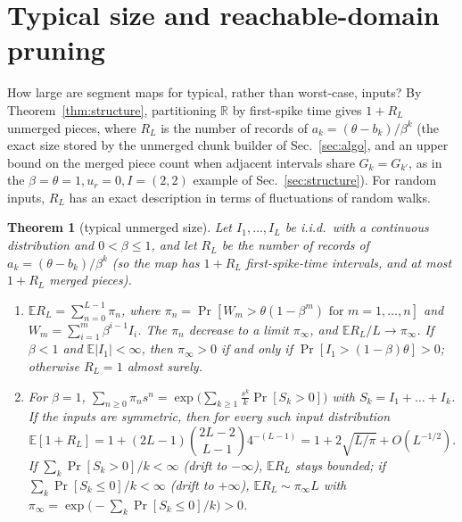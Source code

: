 \documentclass[10pt]{article}
\newtheorem{theorem}{Theorem}
\newcounter{algo}
\theoremstyle{remark}
\begin{document}
\begin{table}[t]
\centering\small

\caption{Number of pieces of $L$-step maps for different reset rules (exact arithmetic). Rows 1--6: largest number found by hill-climbing over inputs in $[-1,1.5]$ ($\beta\in\{0.5,0.9,0.99\}$), which gives lower bounds on the maximum. ``Construction'': the explicit inputs of Theorem~\ref{thm:classes}(c)(i), which are not confined to $[-1,1.5]$ when the reset has a drop. Last three rows: the bounds of Theorem~\ref{thm:classes}(a), (b) and (c).}
\label{tab:resets}
\end{table}

\section{Typical size and reachable-domain pruning}
\label{sec:domain}

How large are segment maps for typical, rather than worst-case, inputs? By Theorem~\ref{thm:structure}, partitioning $\mathbb R$ by first-spike time gives $1+R_L$ unmerged pieces, where $R_L$ is the number of records of $a_k=(\theta-b_k)/\beta^k$ (the exact size stored by the unmerged chunk builder of Sec.~\ref{sec:algo}, and an upper bound on the merged piece count when adjacent intervals share $G_k=G_{k'}$, as in the $\beta=\theta=1, u_r=0, I=(2,2)$ example of Sec.~\ref{sec:structure}). For random inputs, $R_L$ has an exact description in terms of fluctuations of random walks.

\begin{theorem}[typical unmerged size]
\label{thm:typical}
Let $I_1,\dots,I_L$ be i.i.d.\ with a continuous distribution and $0<\beta\le1$, and let $R_L$ be the number of records of $a_k=(\theta-b_k)/\beta^k$ (so the map has $1+R_L$ first-spike-time intervals, and at most $1+R_L$ merged pieces).
\begin{enumerate}[label=(\alph*),leftmargin=*]
\item $\mathbb E R_L=\sum_{n=0}^{L-1}\pi_n$, where $\pi_n=\Pr[W_m>\theta(1-\beta^m)\text{ for }m=1,\dots,n]$ and $W_m=\sum_{i=1}^m\beta^{i-1}I_i$. The $\pi_n$ decrease to a limit $\pi_\infty$, and $\mathbb E R_L/L\to\pi_\infty$. If $\beta<1$ and $\mathbb E|I_1|<\infty$, then $\pi_\infty>0$ if and only if $\Pr[I_1>(1-\beta)\theta]>0$; otherwise $R_L=1$ almost surely.
\item For $\beta=1$, $\sum_{n\ge0}\pi_ns^n=\exp\big(\sum_{k\ge1}\tfrac{s^k}{k}\Pr[S_k>0]\big)$ with $S_k=I_1+\dots+I_k$. If the inputs are symmetric, then for every such input distribution
\[\mathbb E[1+R_L]=1+(2L-1)\binom{2L-2}{L-1}4^{-(L-1)}=1+2\sqrt{L/\pi}+O(L^{-1/2}).\]
If $\sum_k\Pr[S_k>0]/k<\infty$ (drift to $-\infty$), $\mathbb E R_L$ stays bounded; if $\sum_k\Pr[S_k\le0]/k<\infty$ (drift to $+\infty$), $\mathbb E R_L\sim\pi_\infty L$ with $\pi_\infty=\exp\big(-\sum_k\Pr[S_k\le0]/k\big)>0$.
\end{enumerate}
\end{theorem}
\end{document}
